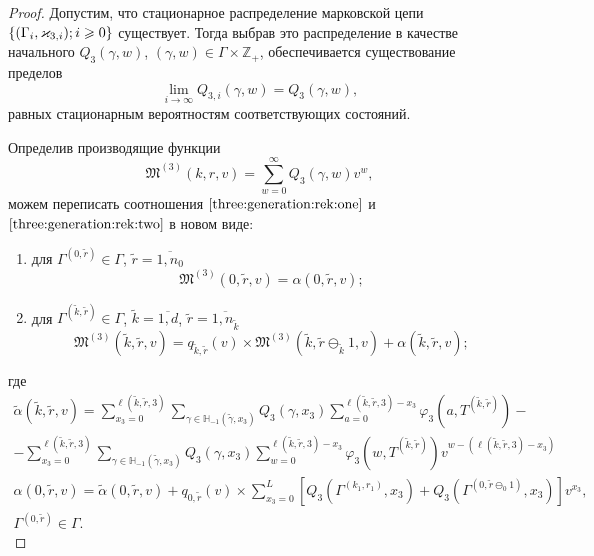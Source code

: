 \documentclass[a4paper,12pt,russian]{extarticle}
\newcommand{\MarkThree}{\{(\Gamma_i, \varkappa_{3,i}); \hm{} i \geqslant 0\}}
\begin{document}
\begin{proof}

Допустим, что стационарное распределение марковской цепи $\MarkThree$ существует. Тогда выбрав это распределение в качестве начального $Q_3(\gamma,w)$, $(\gamma,w)\in \Gamma\times {\mathbb Z}_+$, обеспечивается существование пределов 
$$
\lim_{i\to \infty} Q_{3,i}(\gamma,w) = Q_3(\gamma,w),
$$
равных стационарным вероятностям соответствующих состояний. 

Определив производящие функции
$$
\mathfrak{M}^{(3)}(k,r,v) = \sum_{w=0}^{\infty} Q_3(\gamma,w) v^w,
$$
можем переписать соотношения $\eqref{three:generation:rek:one}$ и $\eqref{three:generation:rek:two}$ в новом виде:
\begin{enumerate}
\item для $ \Gamma^{(0,\tilde{r})} \in \Gamma$, $\tilde{r} = \overline{1,n_0}$ 
\begin{equation}
\mathfrak{M}^{(3)}(0,\tilde{r},v) = \alpha(0,\tilde{r},v);
\label{three:generation:one}
\end{equation}
\item для $\Gamma^{(\tilde{k},\tilde{r})} \in \Gamma $, $\tilde{k} =\overline{1,d}$, $\tilde{r}=\overline{1,n_{\tilde{k}}}$
\begin{equation}
\mathfrak{M}^{(3)}(\tilde{k},\tilde{r},v) = q_{\tilde{k},\tilde{r}} (v)\times  \mathfrak{M}^{(3)}(\tilde{k},\tilde{r} \ominus_{\tilde{k}} 1,v) + \alpha(\tilde{k},\tilde{r},v);
\label{three:generation:two}
\end{equation}
\end{enumerate}
где 
\begin{multline}
\tilde{\alpha}(\tilde{k},\tilde{r},v) = \sum_{x_3=0}^{\ell(\tilde{k},\tilde{r},3)}\sum_{\gamma \in {\mathbb H}_{-1}(\tilde{\gamma},x_3)} Q_3(\gamma,x_3) \sum_{a=0}^{\ell(\tilde{k},\tilde{r},3) - x_3} \varphi_3(a,T^{(\tilde{k},\tilde{r})}) - \\
- \sum_{x_3=0}^{\ell(\tilde{k},\tilde{r},3)}  \sum_{\gamma \in {\mathbb H}_{-1}(\tilde{\gamma},x_3)} Q_3(\gamma,x_3) \sum_{w=0}^{\ell(\tilde{k},\tilde{r},3) -x_3}
\varphi_3(w,T^{(\tilde{k},\tilde{r})}) v^{w-(\ell(\tilde{k},\tilde{r},3)-x_3)}
\end{multline}
\begin{multline}
\alpha(0,\tilde{r},v) =\tilde{\alpha}(0,\tilde{r},v) + q_{0,\tilde{r}}(v) \times \sum_{x_3=0}^{L} \left[ Q_3(\Gamma^{(k_1,r_1)},x_3) + Q_3(\Gamma^{(0,\tilde{r}\ominus_0 1)},x_3) \right] v^{x_3}, \\ \Gamma^{(0,\tilde{r})} \in \Gamma.
\end{multline}

\end{proof}
\end{document}
